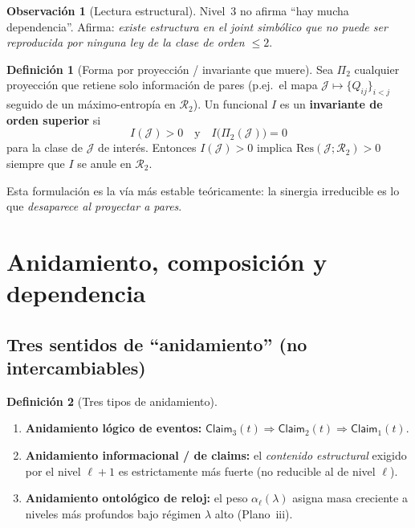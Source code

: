 \documentclass[11pt,a4paper]{article}
\theoremstyle{definition}
\newtheorem{definition}{Definici\'on}[section]
\newtheorem{remark}{Observaci\'on}[section]
\theoremstyle{plain}
\theoremstyle{remark}
\newcommand{\Res}{\mathrm{Res}}
\newcommand{\Rtwo}{\mathcal{R}_2}
\newcommand{\Jwin}{\mathcal{J}}
\newcommand{\claim}{\mathsf{Claim}}
\begin{document}
\begin{remark}[Lectura estructural]
Nivel~3 no afirma ``hay mucha dependencia''. Afirma: \emph{existe
estructura en el joint simb\'olico que no puede ser reproducida por
ninguna ley de la clase de orden $\le 2$}.
\end{remark}

\begin{definition}[Forma por proyecci\'on / invariante que muere]
\label{def:invariant_dies}
Sea $\Pi_2$ cualquier proyecci\'on que retiene solo informaci\'on de
pares (p.ej.\ el mapa $\Jwin\mapsto\{Q_{ij}\}_{i<j}$ seguido de un
m\'aximo-entrop\'ia en $\Rtwo$). Un funcional $I$ es un
\textbf{invariante de orden superior} si
\begin{equation}
I(\Jwin)>0
\quad\text{y}\quad
I\bigl(\Pi_2(\Jwin)\bigr)=0
\end{equation}
para la clase de $\Jwin$ de inter\'es. Entonces $I(\Jwin)>0$ implica
$\Res(\Jwin;\Rtwo)>0$ siempre que $I$ se anule en $\Rtwo$.
\end{definition}

Esta formulaci\'on es la v\'ia m\'as estable te\'oricamente: la sinergia
irreducible es lo que \emph{desaparece al proyectar a pares}.

\section{Anidamiento, composici\'on y dependencia}
\label{sec:nesting}

\subsection{Tres sentidos de ``anidamiento'' (no intercambiables)}

\begin{definition}[Tres tipos de anidamiento]
\label{def:nesting_types}
\begin{enumerate}[label=(\Roman*)]
  \item \textbf{Anidamiento l\'ogico de eventos:}
  $\claim_3(t)\Rightarrow\claim_2(t)\Rightarrow\claim_1(t)$.
  \item \textbf{Anidamiento informacional / de claims:}
  el \emph{contenido estructural} exigido por el nivel $\ell{+}1$ es
  estrictamente m\'as fuerte (no reducible al de nivel $\ell$).
  \item \textbf{Anidamiento ontol\'ogico de reloj:}
  el peso $\alpha_\ell(\lambda)$ asigna masa creciente a niveles m\'as
  profundos bajo r\'egimen $\lambda$ alto (Plano~iii).
\end{enumerate}
\end{definition}
\end{document}
